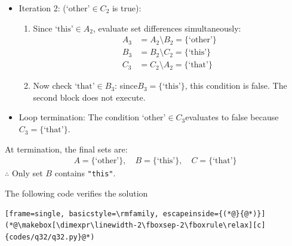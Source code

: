 \begin{enumerate}[label=\thesubsection.\arabic*, ref=\thesubsection.\theenumi]
\begin{itemize}
	\item Iteration 2: ($\text{`other'} \in C_2$ is true):
	\begin{enumerate}
		\item Since $\text{`this'} \in A_2$, evaluate set differences simultaneously:
		\begin{align}
			A_3 &= A_2 \setminus B_2 = \{\text{`other'}\} \\
			B_3 &= B_2 \setminus C_2 = \{\text{`this'}\} \\
			C_3 &= C_2 \setminus A_2 = \{\text{`that'}\}
		\end{align}
		\item Now check $\text{`that'} \in B_3$: since$B_3 = \{\text{`this'}\}$, this condition is false. The second block does not execute.
	\end{enumerate}
	
	\item Loop termination: The condition $\text{`other'} \in C_3$evaluates to false because$C_3 = \{\text{`that'}\}$.
\end{itemize}
At termination, the final sets are:
\begin{align}
	A = \{\text{`other'}\}, \quad B = \{\text{`this'}\}, \quad C = \{\text{`that'}\}
\end{align}
$\therefore$ Only set $B$ contains \texttt{"this"}.

The following code verifies the solution
\begin{lstlisting}[frame=single, basicstyle=\rmfamily, escapeinside={(*@}{@*)}]
(*@\makebox[\dimexpr\linewidth-2\fboxsep-2\fboxrule\relax][c]{codes/q32/q32.py}@*)
\end{lstlisting}
	

\end{enumerate}
